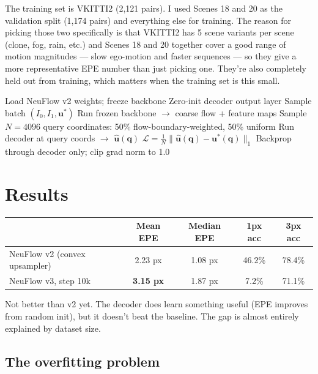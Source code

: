 \documentclass[11pt,a4paper]{article}
\begin{document}
The training set is VKITTI2 (2,121 pairs). I used Scenes 18 and 20 as the validation split (1,174 pairs) and everything else for training. The reason for picking those two specifically is that VKITTI2 has 5 scene variants per scene (clone, fog, rain, etc.) and Scenes 18 and 20 together cover a good range of motion magnitudes --- slow ego-motion and faster sequences --- so they give a more representative EPE number than just picking one. They're also completely held out from training, which matters when the training set is this small.

\begin{algorithm}[H]
\caption{Training loop (simplified)}
\begin{algorithmic}[1]
\State Load NeuFlow v2 weights; freeze backbone
\State Zero-init decoder output layer
  \State Sample batch $(I_0, I_1, \mathbf{u}^*)$
  \State Run frozen backbone $\to$ coarse flow + feature maps
  \State Sample $N=4096$ query coordinates: 50\% flow-boundary-weighted, 50\% uniform
  \State Run decoder at query coords $\to$ $\hat{\mathbf{u}}(\mathbf{q})$
  \State $\mathcal{L} = \frac{1}{N}\|\hat{\mathbf{u}}(\mathbf{q}) - \mathbf{u}^*(\mathbf{q})\|_1$
  \State Backprop through decoder only; clip grad norm to 1.0
\EndFor
\end{algorithmic}
\end{algorithm}

\section{Results}

\begin{center}
\begin{tabular}{lcccc}
\toprule
& \textbf{Mean EPE} & \textbf{Median EPE} & \textbf{1px acc} & \textbf{3px acc} \\
\midrule
NeuFlow v2 (convex upsampler) & 2.23 px & 1.08 px & 46.2\% & 78.4\% \\
NeuFlow v3, step 10k & \textbf{3.15 px} & 1.87 px & 7.2\% & 71.1\% \\
\bottomrule
\end{tabular}
\end{center}

Not better than v2 yet. The decoder does learn something useful (EPE improves from random init), but it doesn't beat the baseline. The gap is almost entirely explained by dataset size.

\subsection{The overfitting problem}
\end{document}
